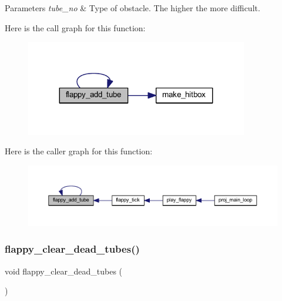 \begin{DoxyParams}{Parameters}
{\em tube\+\_\+no} & Type of obstacle. The higher the more difficult. \\
\hline
\end{DoxyParams}
Here is the call graph for this function\+:\nopagebreak
\begin{figure}[H]
\begin{center}
\leavevmode
\includegraphics[width=275pt]{group__flappy_ga0ae0e6cba690a1cba3a4514879eb1987_cgraph}
\end{center}
\end{figure}
Here is the caller graph for this function\+:\nopagebreak
\begin{figure}[H]
\begin{center}
\leavevmode
\includegraphics[width=350pt]{group__flappy_ga0ae0e6cba690a1cba3a4514879eb1987_icgraph}
\end{center}
\end{figure}
\mbox{\label{group__flappy_gac459c993f010cd477b1cff328d2e6ce4}} 
\subsubsection{\texorpdfstring{flappy\+\_\+clear\+\_\+dead\+\_\+tubes()}{flappy\_clear\_dead\_tubes()}}
{\footnotesize\ttfamily void flappy\+\_\+clear\+\_\+dead\+\_\+tubes (\begin{DoxyParamCaption}{ }\end{DoxyParamCaption})}



